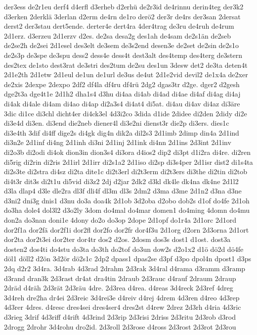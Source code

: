 {der3ess
de2r1eu
derf4
d4erfl
d3erheb
d2erhü
de2r3id
de4rinnu
derin4teg
der3k2
d3erken
2derklä
3derlan
d2erm
de4rn
de1ro
derö2
der3r
de4rs
der3san
2dersat
derst2
der3stau
dert5ende.
derter4e
dert4ra
4der4trag
de3ru
de4ruh
de4rum
2d1erz.
d3erzeu
2d1erzv
d2es.
de2sa
desa2g
des1ah
de4sam
de2s1än
de2seb
de2se2h
de2sei
2d1esel
des3elt
de3sem
de3s2end
desen3e
de2set
de2sin
de2s1o
de2s3p
de3spe
de3spu
dess2
dess4e
dess4t
dest3alt
des4temp
des4terg
de3stern
des2tex
de1sto
dest3rat
de3stri
des2tum
de2su
des1un
3desw
det2
de3ta
deten4t
2d1e2th
2d1etw
2d1eul
de1un
de1url
de3us
de4ut
2d1e2vid
devil2
de1x4a
de2xer
de2xis
2dexpe
2dexpo
2df2
df4la
df4ru
df4rü
2dg2
dgas3tr
d2ge.
dger2
d2gesh
dge2t3a
dge4t1e
2d1h2
dha1s4
d3hu
di4aa
di4ab
di4ad
di4ae
di4af
di4ag
di4aj
di4ak
di4ale
di4am
di4ao
di4ap
di2a3s4
di4at4
di5at.
di4au
di4av
di4az
di3äre
3dic
di1ce
di3chl
dicht4er
di4ck3el
4d3i2co
3dida
d1ide
2didee
di2den
2didy
di2e
di3e4d
di3en.
di3end
die2neb
diener4l
di3e2ni
dienst3r
die2p
di3ers.
dies1c
di3e4th
3dif
di4ff
dige2s
di4gk
dig4n
dik2a
dil2s3
2d1imb
2dimp
din4a
2d1ind
di3n2e
2d1inf
di4ng
2d1inh
di3ni
2d1inj
2d1ink
di4nn
2d1ins
2d3int
2d1inv
di2o3b
di2odi
di4ok
dion3in
dion3s4
di3ora
d4ios2
dip2
di3pt
d1i2ra
di4re.
di2ren
di5rig
di2rin
di2ris
2d1irl
2d1irr
di2s1a2
2d1iso
di2sp
di3s4per
2d1isr
dist2
di1s4ta
di2s3te
di2stra
di4sz
di2ta
dite1c
di2t3erl
di2t3erm
di2t3ers
di3the
di2tin
di2tob
di4t3r
dit3s
di2t1u
di5vid
di3z2
2dj
d2jar
2dk2
d3kl
dk4le
dk4na
dk4ne
2d1l2
d3la
dlap4
d3le
dle2ra
dl3f
dli4f
dl3m
dl3s
2dm2
d3ma
d3me
2d1n2
d3na
d3ne
d3ni2
dni3g
dnis1
d3nu
do3a
doa4k
2d1ob
3d2oba
d2obo
dob2s
d1of
do4fe
2d1oh
do3ha
dole4
dol3l2
d3o2ly
3dom
do4mal
do4mar
domen1
do4ming
4domn
do4mu
don2a
do3nan
doni1e
4dony
do2o
do3op
2dope
2d1opf
do1r4a
2d1orc
2d1ord
dor2f1a
dor2fä
dor2f1i
dor2fl
dor2fo
dor2fr
dor4f3u
2d1org
d2orn
2d3orna
2d1ort
dor2ta
dor2t3ei
dor2ter
dor4tr
dos2
d2os.
2dosm
dos3s
dost1
d1ost.
dost3a
dosten2
dos4ti
do4stu
do3ta
do3th
do2tof
do3un
dow2s
d2o1x2
d1ö
dö2d
dö4fe
döl1
döll2
d2ön
3d2ör
dö2s1c
2dp2
dpass1
dpas2se
d3pf
d3po
dpol4n
dpost1
d3ps
2dq
d2r2
3d4ra.
3d4rab
4d3rad
2drahm
2d3rak
3d4ral
d4rama
d3ramm
d3ramp
d3rand
dran3k
2d3rast
dr4at
dra4tin
2draub
2d3rauc
d4rauf
2draum
2draup
2dräd
d4räh
2d3rät
2d3räu
4dre.
2d3rea
d4rea.
d4reas
3d4reck
2d3ref
4dreg
3d4reh
dre2ha
dr4ei
2d3reic
3d4rei3e
d4reiv
d4rej
4drem
4d3ren
d4reo
4d3rep
4d3rer
4dres.
d4resc
dres4sei
dres4ser4
dres2st
d4rew
2drez
2d3rh
d4ria
4d3ric
d3rieg
3drif
4d3riff
d4rift
4d3rind
2d3rip
2d3risi
2driss
2d3ritu
2d3rob
d3rod
2drogg
2drohr
3d4rohu
dro2id.
2d3roll
2d3rose
d4ross
2d3rost
2d3rot
2d3rou
}
